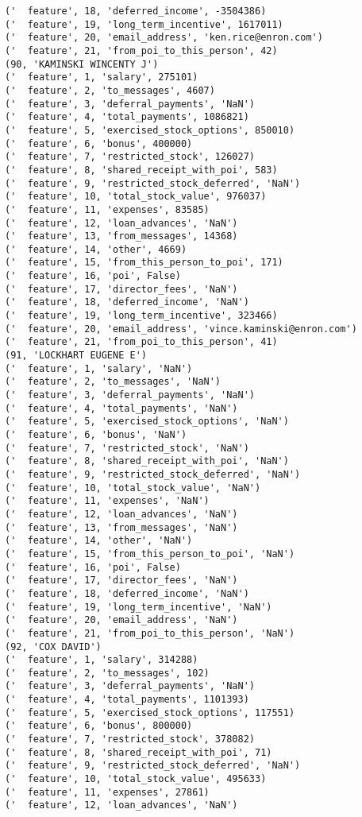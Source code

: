 \begin{verbatim}
('  feature', 18, 'deferred_income', -3504386)
('  feature', 19, 'long_term_incentive', 1617011)
('  feature', 20, 'email_address', 'ken.rice@enron.com')
('  feature', 21, 'from_poi_to_this_person', 42)
(90, 'KAMINSKI WINCENTY J')
('  feature', 1, 'salary', 275101)
('  feature', 2, 'to_messages', 4607)
('  feature', 3, 'deferral_payments', 'NaN')
('  feature', 4, 'total_payments', 1086821)
('  feature', 5, 'exercised_stock_options', 850010)
('  feature', 6, 'bonus', 400000)
('  feature', 7, 'restricted_stock', 126027)
('  feature', 8, 'shared_receipt_with_poi', 583)
('  feature', 9, 'restricted_stock_deferred', 'NaN')
('  feature', 10, 'total_stock_value', 976037)
('  feature', 11, 'expenses', 83585)
('  feature', 12, 'loan_advances', 'NaN')
('  feature', 13, 'from_messages', 14368)
('  feature', 14, 'other', 4669)
('  feature', 15, 'from_this_person_to_poi', 171)
('  feature', 16, 'poi', False)
('  feature', 17, 'director_fees', 'NaN')
('  feature', 18, 'deferred_income', 'NaN')
('  feature', 19, 'long_term_incentive', 323466)
('  feature', 20, 'email_address', 'vince.kaminski@enron.com')
('  feature', 21, 'from_poi_to_this_person', 41)
(91, 'LOCKHART EUGENE E')
('  feature', 1, 'salary', 'NaN')
('  feature', 2, 'to_messages', 'NaN')
('  feature', 3, 'deferral_payments', 'NaN')
('  feature', 4, 'total_payments', 'NaN')
('  feature', 5, 'exercised_stock_options', 'NaN')
('  feature', 6, 'bonus', 'NaN')
('  feature', 7, 'restricted_stock', 'NaN')
('  feature', 8, 'shared_receipt_with_poi', 'NaN')
('  feature', 9, 'restricted_stock_deferred', 'NaN')
('  feature', 10, 'total_stock_value', 'NaN')
('  feature', 11, 'expenses', 'NaN')
('  feature', 12, 'loan_advances', 'NaN')
('  feature', 13, 'from_messages', 'NaN')
('  feature', 14, 'other', 'NaN')
('  feature', 15, 'from_this_person_to_poi', 'NaN')
('  feature', 16, 'poi', False)
('  feature', 17, 'director_fees', 'NaN')
('  feature', 18, 'deferred_income', 'NaN')
('  feature', 19, 'long_term_incentive', 'NaN')
('  feature', 20, 'email_address', 'NaN')
('  feature', 21, 'from_poi_to_this_person', 'NaN')
(92, 'COX DAVID')
('  feature', 1, 'salary', 314288)
('  feature', 2, 'to_messages', 102)
('  feature', 3, 'deferral_payments', 'NaN')
('  feature', 4, 'total_payments', 1101393)
('  feature', 5, 'exercised_stock_options', 117551)
('  feature', 6, 'bonus', 800000)
('  feature', 7, 'restricted_stock', 378082)
('  feature', 8, 'shared_receipt_with_poi', 71)
('  feature', 9, 'restricted_stock_deferred', 'NaN')
('  feature', 10, 'total_stock_value', 495633)
('  feature', 11, 'expenses', 27861)
('  feature', 12, 'loan_advances', 'NaN')

\end{verbatim}
